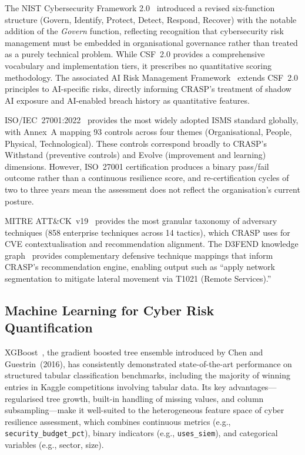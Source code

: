 \documentclass[journal]{IEEEtran}
\begin{document}
The NIST Cybersecurity Framework 2.0~\cite{nist_csf2} introduced a revised
six-function structure (Govern, Identify, Protect, Detect, Respond, Recover)
with the notable addition of the \emph{Govern} function, reflecting recognition
that cybersecurity risk management must be embedded in organisational governance
rather than treated as a purely technical problem. While CSF~2.0 provides
a comprehensive vocabulary and implementation tiers, it prescribes no
quantitative scoring methodology. The associated AI Risk Management
Framework~\cite{nist_ai_rmf} extends CSF~2.0 principles to AI-specific risks,
directly informing CRASP's treatment of shadow AI exposure and AI-enabled
breach history as quantitative features.

ISO/IEC~27001:2022~\cite{iso27001} provides the most widely adopted ISMS
standard globally, with Annex~A mapping 93 controls across four themes
(Organisational, People, Physical, Technological). These controls correspond
broadly to CRASP's Withstand (preventive controls) and Evolve (improvement
and learning) dimensions. However, ISO~27001 certification produces a binary
pass/fail outcome rather than a continuous resilience score, and re-certification
cycles of two to three years mean the assessment does not reflect the
organisation's current posture.

MITRE ATT\&CK~v19~\cite{mitre_attack} provides the most granular taxonomy
of adversary techniques (858 enterprise techniques across 14 tactics), which
CRASP uses for CVE contextualisation and recommendation alignment. The D3FEND
knowledge graph~\cite{nist_csf2} provides complementary defensive technique
mappings that inform CRASP's recommendation engine, enabling output such as
``apply network segmentation to mitigate lateral movement via T1021 (Remote
Services).''

\subsection{Machine Learning for Cyber Risk Quantification}

XGBoost~\cite{chen2016xgboost}, the gradient boosted tree ensemble introduced
by Chen and Guestrin~(2016), has consistently demonstrated state-of-the-art
performance on structured tabular classification benchmarks, including the
majority of winning entries in Kaggle competitions involving tabular data.
Its key advantages---regularised tree growth, built-in handling of missing
values, and column subsampling---make it well-suited to the heterogeneous
feature space of cyber resilience assessment, which combines continuous metrics
(e.g., \texttt{security\_budget\_pct}), binary indicators (e.g.,
\texttt{uses\_siem}), and categorical variables (e.g., sector, size).
\end{document}
